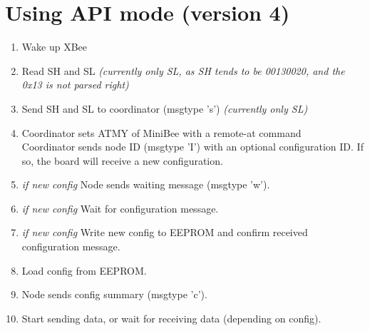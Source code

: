 \documentclass[letterpaper,10pt]{article}
\begin{document}

% 

\section{Using API mode (version 4)}

\begin{enumerate}
 \item Wake up XBee
 \item Read SH and SL \textit{(currently only SL, as SH tends to be 00130020, and the 0x13 is not parsed right)}
 \item Send SH and SL to coordinator (msgtype 's') \textit{(currently only SL)}
 \item Coordinator sets ATMY of MiniBee with a remote-at command\\
	Coordinator sends node ID (msgtype 'I') with an optional configuration ID. If so, the board will receive a new configuration.
 \item \textit{if new config} Node sends waiting message (msgtype 'w').
 \item \textit{if new config} Wait for configuration message.
 \item \textit{if new config} Write new config to EEPROM and confirm received configuration message.
 \item Load config from EEPROM.
 \item Node sends config summary (msgtype 'c').
 \item Start sending data, or wait for receiving data (depending on config).
\end{enumerate}
\end{document}
